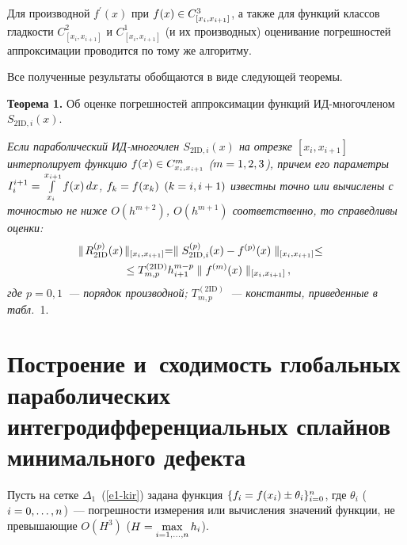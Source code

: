\begin{multicols}{2}
  Для производной $f^\prime(x)$ при $f(x)\hm\in C^3_{[x_i,x_{i+1}]}$, а также 
для функций классов гладкости $C^2_{[x_i,x_{i+1}]}$ и $C^1_{[x_i,x_{i+1}]}$ 
(и их производных) оценивание погрешностей аппроксимации проводится по 
тому же алгоритму.
  
  Все полученные результаты обобщаются в виде следующей теоремы.
  
  \medskip
  
  \noindent
\textbf{Теорема 1.} {Об оценке погрешностей аппроксимации функций 
ИД-мно\-го\-чле\-ном $S_{2\mathrm{ID},i}(x)$}.
  
  \textit{Если параболический ИД-мно\-го\-член $S_{2\mathrm{ID},i}(x)$ на отрезке 
$[x_i,x_{i+1}]$ интерполирует функцию $f(x)\hm\in C^m_{x_i,x_{i+1}}$ 
($m\hm=1,2,3$), причем его параметры $I_i^{i+1}\hm= 
\int\limits_{x_i}^{x_{i+1}} f(x)\,dx$, $f_k\hm=f(x_k)$ $(k\hm=i,i+1)$ известны 
точно или вычислены с точностью не ниже $O(h^{m+2})$, $O(h^{m+1})$ 
соответственно, то справедливы оценки:
  \begin{multline}
  \hspace*{-3mm}\parallel \!R^{(p)}_{2\mathrm{ID}}(x)\!\parallel_{[x_i,x_{i+1}]} = \parallel 
S^{(p)}_{2\mathrm{ID},i}(x) -f^{(p)}(x)\parallel_{[x_i,x_{i+1}]}\leq {}\\
{}\leq T^{(2\mathrm{ID})}_{m,p} 
h^{m-p}_{i+1} \parallel f^{(m)}(x)\parallel_{[x_i,x_{i+1}]}\,,
  \label{e8-kir}
  \end{multline}
где $p=0,1$~--- порядок производной; $T_{m,p}^{(2\mathrm{ID})}$~--- константы, 
приведенные в табл.}~1.




\section{Построение и~сходимость глобальных параболических 
интегродифференциальных сплайнов минимального дефекта}
  
  Пусть на сетке $\Delta_1$~(\ref{e1-kir}) задана функция $\{ f_i \hm= f(x_i) 
\hm\pm \theta_i\}^n_{i=0}$, где $\theta_i$ ($i\hm=0,\ldots ,n$)~--- погрешности 
измерения или вычисления значений функции, не превышающие $O(H^3)$ 
($H\hm= \max\limits_{i=1,\ldots ,n} h_i$). 
  

\end{multicols}
